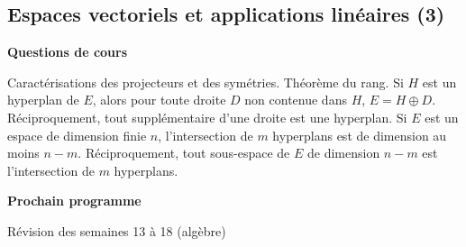 





\subsection{Espaces vectoriels et applications linéaires (3)}



\bigskip

\begin{center}
 \textbf{Questions de cours}
\end{center}
Caractérisations des projecteurs et des symétries.\newline
Théorème du rang.\newline
Si $H$ est un hyperplan de $E$, alors pour toute droite $D$ non contenue dans $H$, $E=H\oplus D$. Réciproquement, tout supplémentaire d'une droite est une hyperplan.\newline
Si $E$ est un espace de dimension finie $n$, l'intersection de $m$ hyperplans est de dimension au moins $n-m$. Réciproquement, tout sous-espace de $E$ de dimension $n-m$ est l'intersection de $m$ hyperplans.

\begin{center}
 \textbf{Prochain programme}
\end{center}

Révision des semaines 13 à 18 (algèbre)


